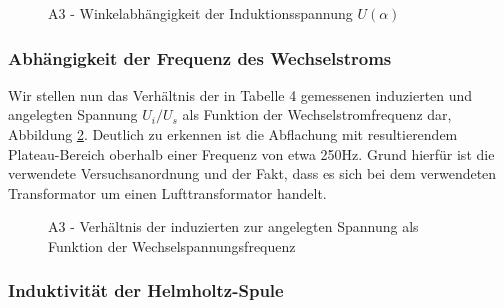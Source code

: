 \documentclass{article}
\begin{document}
\begin{figure}[!b]
    \centering
    \caption{A3 - Winkelabhängigkeit der Induktionsspannung $U(\alpha)$}
    \label{fig:A3-U(alpha)}
\end{figure}

\newpage
\subsubsection{Abhängigkeit der Frequenz des Wechselstroms}

Wir stellen nun das Verhältnis der in Tabelle 4 gemessenen induzierten und angelegten Spannung $U_i / U_s$ als Funktion der Wechselstromfrequenz dar, Abbildung \ref{fig:A3-U(f)}. Deutlich zu erkennen ist die Abflachung mit resultierendem Plateau-Bereich oberhalb einer Frequenz von etwa 250Hz. Grund hierfür ist die verwendete Versuchsanordnung und der Fakt, dass es sich bei dem verwendeten Transformator um einen Lufttransformator handelt.

\begin{figure}[!h]
    \centering
    \caption{A3 - Verhältnis der induzierten zur angelegten Spannung als Funktion der Wechselspannungsfrequenz}
    \label{fig:A3-U(f)}
\end{figure}


\newpage
\subsubsection{Induktivität der Helmholtz-Spule}
\end{document}
